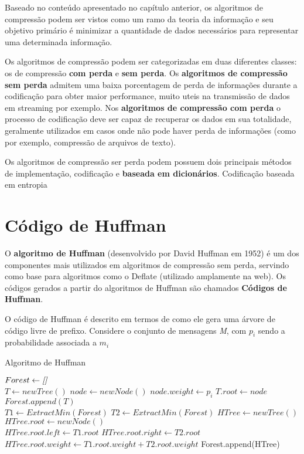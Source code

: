 Baseado no conteúdo apresentado no capítulo anterior, os algoritmos de compressão podem ser vistos como um ramo da teoria da informação e seu objetivo primário é minimizar a quantidade de dados necessários para representar uma determinada informação.

Os algoritmos de compressão podem ser categorizadas em duas diferentes classes: os de compressão \textbf{com perda} e \textbf{sem perda}. Os \textbf{algoritmos de compressão sem perda} admitem uma baixa porcentagem de perda de informações durante a codificação para obter maior performance, muito uteis na transmissão de dados em streaming por exemplo. Nos \textbf{algoritmos de compressão com perda} o processo de codificação deve ser capaz de recuperar os dados em sua totalidade, geralmente utilizados em casos onde não pode haver perda de informações (como por exemplo, compressão de arquivos de texto).

Os algoritmos de compressão ser perda podem possuem dois principais métodos de implementação, codificação  e \textbf{baseada em dicionários}. Codificação baseada em entropia 

\section{Código de Huffman}
O \textbf{algoritmo de Huffman} (desenvolvido por David Huffman em 1952) é um dos componentes mais utilizados em algoritmos de compressão sem perda, servindo como base para algoritmos como o Deflate (utilizado amplamente na web).
Os códigos gerados a partir do algoritmos de Huffman são chamados \textbf{Códigos de Huffman}.

O código de Huffman é descrito em termos de como ele gera uma árvore de código livre de prefixo. Considere o conjunto de mensagens \emph{M}, com $p_i$ sendo a probabilidade associada a $m_i$

\begin{algorithm}[H]
\caption{Algoritmo de Huffman} \label{alg:huff}
\begin{algorithmic}
	\State $Forest \gets \emph{[]}$\\
	 
		\State $T \gets newTree()$
		\State $node \gets newNode()$
		\State $node.weight \gets p_i$ 
		\State $T.root \gets node$
		\State $Forest.append(T)$ 
	\EndFor \\
	
		\State $T1 \gets ExtractMin(Forest)$ 
		\State $T2 \gets ExtractMin(Forest)$
		\State $HTree \gets newTree()$
		\State $HTree.root \gets newNode()$ \\
		\State $HTree.root.left \gets T1.root$
		\State $HTree.root.right \gets T2.root$
		\State $HTree.root.weight \gets T1.root.weight + T2.root.weight$
		\State Forest.append(HTree) 
	\EndWhile
\end{algorithmic}
\end{algorithm}

